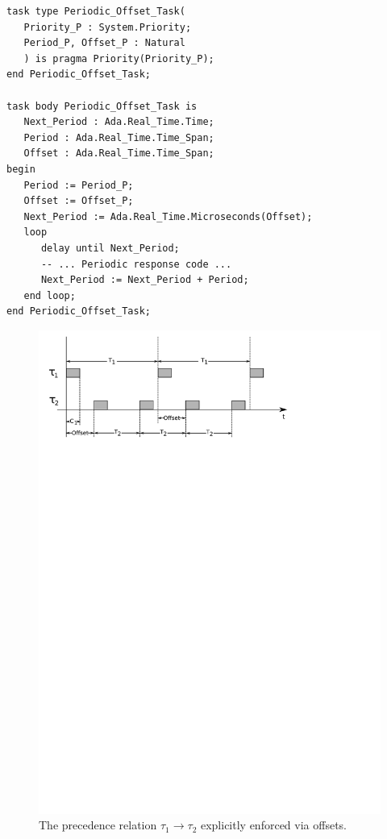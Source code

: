 \begin{minipage}{\listingwidth}
\lstset{language=ada,
  numbers=left,
  numberstyle=\tiny
}
\begin{lstlisting}[label=lst:starting_offset, caption=A periodic task
    with a starting offset of 70 msec]
task type Periodic_Offset_Task(
   Priority_P : System.Priority;
   Period_P, Offset_P : Natural
   ) is pragma Priority(Priority_P);
end Periodic_Offset_Task;

task body Periodic_Offset_Task is
   Next_Period : Ada.Real_Time.Time;
   Period : Ada.Real_Time.Time_Span;
   Offset : Ada.Real_Time.Time_Span;
begin
   Period := Period_P;
   Offset := Offset_P;
   Next_Period := Ada.Real_Time.Microseconds(Offset);
   loop
      delay until Next_Period;
      -- ... Periodic response code ...
      Next_Period := Next_Period + Period;
   end loop;
end Periodic_Offset_Task;
\end{lstlisting}
\end{minipage}

\begin{figure}
\centering
\includegraphics[scale=0.75]{figs/precedence_offset}
\caption{The precedence relation $\tau_1 \to \tau_2$ explicitly
  enforced via offsets.}
\label{fig:starting_offset}
\end{figure}

